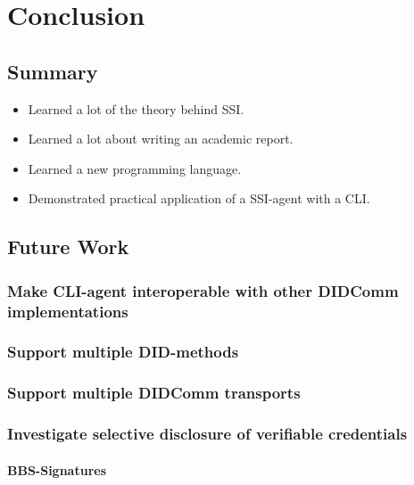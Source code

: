 \chapter{Conclusion}


\section{Summary}
\begin{itemize}
    \item Learned a lot of the theory behind SSI.
    \item Learned a lot about writing an academic report.
    \item Learned a new programming language.
    \item Demonstrated practical application of a SSI-agent with a CLI.
\end{itemize}



\section{Future Work}

\subsection{Make CLI-agent interoperable with other DIDComm implementations}

\subsection{Support multiple DID-methods}

\subsection{Support multiple DIDComm transports}

\subsection{Investigate selective disclosure of verifiable credentials}

\subsubsection{BBS-Signatures}
